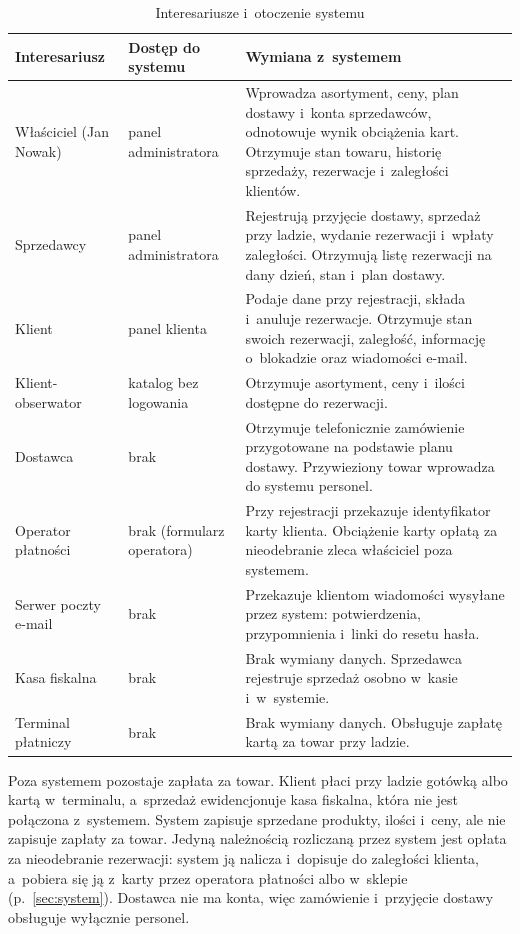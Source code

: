 \documentclass[12pt,a4paper,oneside]{article}
\begin{document}
\begin{table}[H]
	\centering
	\caption{Interesariusze i~otoczenie systemu}
	\label{tab:otoczenie}
	\small
	\begin{tabularx}{\textwidth}{@{}L{3.3cm}L{2.9cm}>{\raggedright\arraybackslash}X@{}}
		\toprule
		Interesariusz & Dostęp do systemu & Wymiana z~systemem \\
		\midrule
		Właściciel (Jan Nowak) & panel administratora & Wprowadza asortyment, ceny, plan dostawy i~konta sprzedawców, odnotowuje wynik obciążenia kart. Otrzymuje stan towaru, historię sprzedaży, rezerwacje i~zaległości klientów. \\
		Sprzedawcy & panel administratora & Rejestrują przyjęcie dostawy, sprzedaż przy ladzie, wydanie rezerwacji i~wpłaty zaległości. Otrzymują listę rezerwacji na dany dzień, stan i~plan dostawy. \\
		Klient & panel klienta & Podaje dane przy rejestracji, składa i~anuluje rezerwacje. Otrzymuje stan swoich rezerwacji, zaległość, informację o~blokadzie oraz wiadomości e-mail. \\
		Klient-obserwator & katalog bez logowania & Otrzymuje asortyment, ceny i~ilości dostępne do rezerwacji. \\
		Dostawca & brak & Otrzymuje telefonicznie zamówienie przygotowane na podstawie planu dostawy. Przywieziony towar wprowadza do systemu personel. \\
		Operator płatności & brak (formularz operatora) & Przy rejestracji przekazuje identyfikator karty klienta. Obciążenie karty opłatą za nieodebranie zleca właściciel poza systemem. \\
		Serwer poczty e-mail & brak & Przekazuje klientom wiadomości wysyłane przez system: potwierdzenia, przypomnienia i~linki do resetu hasła. \\
		Kasa fiskalna & brak & Brak wymiany danych. Sprzedawca rejestruje sprzedaż osobno w~kasie i~w~systemie. \\
		Terminal płatniczy & brak & Brak wymiany danych. Obsługuje zapłatę kartą za towar przy ladzie. \\
		\bottomrule
	\end{tabularx}
\end{table}

Poza systemem pozostaje zapłata za towar. Klient płaci przy ladzie gotówką albo kartą w~terminalu, a~sprzedaż ewidencjonuje kasa fiskalna, która nie jest połączona z~systemem. System zapisuje sprzedane produkty, ilości i~ceny, ale nie zapisuje zapłaty za towar. Jedyną należnością rozliczaną przez system jest opłata za nieodebranie rezerwacji: system ją nalicza i~dopisuje do zaległości klienta, a~pobiera się ją z~karty przez operatora płatności albo w~sklepie (p.~\ref{sec:system}). Dostawca nie ma konta, więc zamówienie i~przyjęcie dostawy obsługuje wyłącznie personel.
\end{document}
